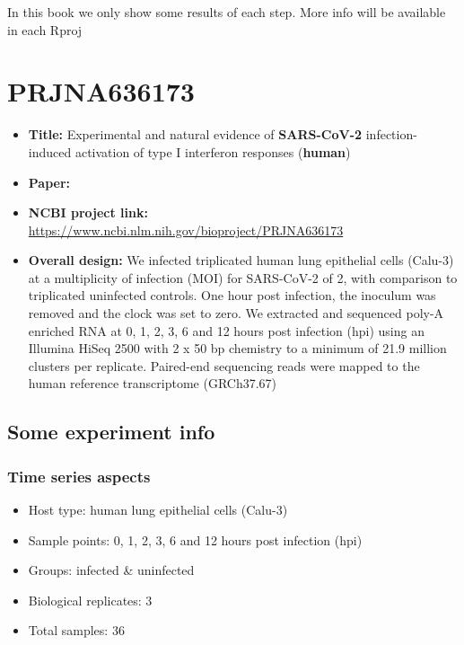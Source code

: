 \documentclass[
]{book}
\providecommand{\tightlist}{%
  \setlength{\itemsep}{0pt}\setlength{\parskip}{0pt}}
\begin{document}
In this book we only show some results of each step. More info will be available in each Rproj

\hypertarget{PRJNA636173}{%
\chapter{PRJNA636173}\label{PRJNA636173}}

\begin{itemize}
\item
  \textbf{Title:} Experimental and natural evidence of \textbf{SARS-CoV-2} infection-induced activation of type I interferon responses (\textbf{human})
\item
  \textbf{Paper:} \citep{Banerjee2021}
\item
  \textbf{NCBI project link:} \url{https://www.ncbi.nlm.nih.gov/bioproject/PRJNA636173}
\item
  \textbf{Overall design:} We infected triplicated human lung epithelial cells (Calu-3) at a multiplicity of infection (MOI) for SARS-CoV-2 of 2, with comparison to triplicated uninfected controls. One hour post infection, the inoculum was removed and the clock was set to zero. We extracted and sequenced poly-A enriched RNA at 0, 1, 2, 3, 6 and 12 hours post infection (hpi) using an Illumina HiSeq 2500 with 2 x 50 bp chemistry to a minimum of 21.9 million clusters per replicate. Paired-end sequencing reads were mapped to the human reference transcriptome (GRCh37.67)
\end{itemize}

\hypertarget{some-experiment-info}{%
\section{Some experiment info}\label{some-experiment-info}}

\hypertarget{time-series-aspects}{%
\subsection{Time series aspects}\label{time-series-aspects}}

\begin{itemize}
\tightlist
\item
  Host type: human lung epithelial cells (Calu-3)\\
\item
  Sample points: 0, 1, 2, 3, 6 and 12 hours post infection (hpi)\\
\item
  Groups: infected \& uninfected\\
\item
  Biological replicates: 3\\
\item
  Total samples: 36
\end{itemize}
\end{document}
